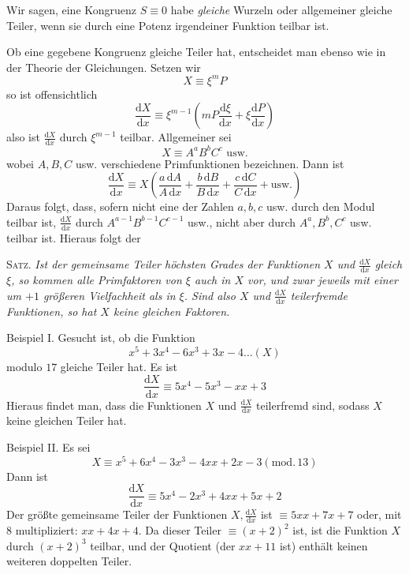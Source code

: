 Wir sagen, eine Kongruenz $S\equiv0$ habe \emph{gleiche} Wurzeln oder allgemeiner gleiche Teiler, wenn sie durch eine Potenz irgendeiner Funktion teilbar ist.

\begingroup{}
Ob eine gegebene Kongruenz gleiche Teiler hat, entscheidet man ebenso wie in der Theorie der Gleichungen. Setzen wir
\[
X\equiv\xi^mP
\]
so ist offensichtlich
\[
\frac{\mathrm{d}X}{\mathrm{d}x}\equiv\xi^{m-1}\left(mP\frac{\mathrm{d}\xi}{\mathrm{d}x}+\xi\frac{\mathrm{d}P}{\mathrm{d}x}\right)
\]
also ist $\frac{\mathrm{d}X}{\mathrm{d}x}$ durch $\xi^{m-1}$ teilbar. Allgemeiner sei
\[
X\equiv A^aB^bC^c\text{ usw.}
\]
wobei $A,B,C$ usw. verschiedene Primfunktionen bezeichnen. Dann ist
\[
\frac{\mathrm{d}X}{\mathrm{d}x}\equiv X\left(\frac{a\,\mathrm{d}A}{A\,\mathrm{d}x}+\frac{b\,\mathrm{d}B}{B\,\mathrm{d}x}+\frac{c\,\mathrm{d}C}{C\,\mathrm{d}x}+\text{usw.}\right)
\]
Daraus folgt, dass, sofern nicht eine der Zahlen $a,b,c$ usw. durch den Modul teilbar ist, $\frac{\mathrm{d}X}{\mathrm{d}x}$ durch $A^{a-1}B^{b-1}C^{c-1}$ usw., nicht aber durch $A^a,B^b,C^c$ usw. teilbar ist. Hieraus folgt der\par\endgroup

\textsc{Satz.} \emph{Ist der gemeinsame Teiler höchsten Grades der Funktionen $X$ und $\frac{\mathrm{d}X}{\mathrm{d}x}$ gleich $\xi$, so kommen alle Primfaktoren von $\xi$ auch in $X$ vor, und zwar jeweils mit einer um $+1$ größeren Vielfachheit als in $\xi$. Sind also $X$ und $\frac{\mathrm{d}X}{\mathrm{d}x}$ teilerfremde Funktionen, so hat $X$ keine gleichen Faktoren.}

Beispiel I. Gesucht ist, ob die Funktion
\[
x^5+3x^4-6x^3+3x-4\ldots(X)
\]
modulo $17$ gleiche Teiler hat. Es ist
\[
\frac{\mathrm{d}X}{\mathrm{d}x}\equiv5x^4-5x^3-xx+3
\]
Hieraus findet man, dass die Funktionen $X$ und $\frac{\mathrm{d}X}{\mathrm{d}x}$ teilerfremd sind, sodass $X$ keine gleichen Teiler hat.

Beispiel II. Es sei
\[
X\equiv x^5+6x^4-3x^3-4xx+2x-3(\mathrm{mod.}\,13)
\]
Dann ist
\[
\frac{\mathrm{d}X}{\mathrm{d}x}\equiv5x^4-2x^3+4xx+5x+2
\]
Der größte gemeinsame Teiler der Funktionen $X,\frac{\mathrm{d}X}{\mathrm{d}x}$ ist $\equiv5xx+7x+7$ oder,
mit $8$ multipliziert: $xx+4x+4$. Da dieser Teiler $\equiv(x+2)^2$ ist, ist die Funktion $X$ durch $(x+2)^3$ teilbar, und der Quotient (der $xx+11$ ist) enthält keinen weiteren doppelten Teiler.

